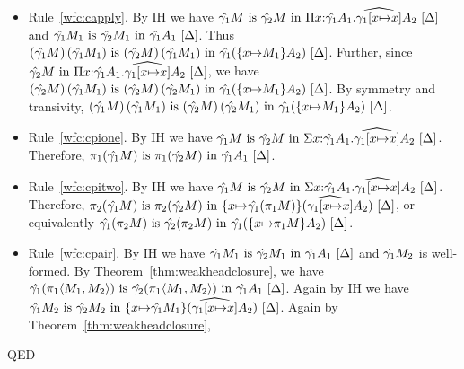 \documentclass{article}
\theoremstyle{break}
\newcommand{\qed}{\mbox{QED}}
\newcommand{\env}{\gamma}
\newcommand{\envone}{\hat{\env_1}}
\newcommand{\envtwo}{\hat{\env_2}}
\newcommand{\envonex}{\widehat{\env_1[\cvar{\mapsto}\cvar]}}
\newenvironment{proof}{\noindent{\bf Proof:}\hspace*{0.5em}}{\hspace*{\fill}\qed}
\begin{document}
\begin{proof}
\begin{itemize}
\item Rule~\ref{wfc:capply}.
By IH we have
$\semanticequivterm{\world}{\envone\constructor}{\envtwo\constructor}
  {\kpi{\cvar}{\envone{\kind_1}}{\envonex{\kind_2}}}$ and
$\semanticequivterm{\world}{\envone\constructor_1}{\envtwo\constructor_1}{\envone\kind_1}$.
Thus
$\semanticequivterm{\world}{\capply{(\envone\constructor)}{(\envone{\constructor_1})}}
   {\capply{(\envtwo\constructor)}{(\envone{\constructor_1})}}
   {\envone(\substitute{\cvar}{\constructor_1}{\kind_2})}$.
Further, since 
$\semanticvalidterm{\world}{\envtwo\constructor}{\kpi{\cvar}{\envone{\kind_1}}{\envonex{\kind_2}}}$,
we have
$\semanticequivterm{\world}{\capply{(\envtwo\constructor)}{(\envone{\constructor_1})}}
   {\capply{(\envtwo\constructor)}{(\envtwo{\constructor_1})}}
   {\envone(\substitute{\cvar}{\constructor_1}{\kind_2})}$.
By symmetry and transivity,
$\semanticequivterm{\world}{\capply{(\envone\constructor)}{(\envone{\constructor_1})}}
   {\capply{(\envtwo\constructor)}{(\envtwo{\constructor_1})}}
   {\envone(\substitute{\cvar}{\constructor_1}{\kind_2})}$.
\item Rule~\ref{wfc:cpione}.
By IH we have
$\semanticequivterm{\world}{\envone\constructor}{\envtwo\constructor}
    {\ksigma{\cvar}{\envone{\kind_1}}{\envonex{\kind_2}}}$.
Therefore, 
$\semanticequivterm{\world}{\cpi{1}{(\envone\constructor)}}{\cpi{1}{(\envtwo\constructor)}}{\envone\kind_1}$.
\item Rule~\ref{wfc:cpitwo}.
By IH we have
$\semanticequivterm{\world}{\envone\constructor}{\envtwo\constructor}
    {\ksigma{\cvar}{\envone{\kind_1}}{\envonex{\kind_2}}}$.
Therefore, 
$\semanticequivterm{\world}{\cpi{2}{(\envone\constructor)}}{\cpi{2}{(\envtwo\constructor)}}
   {\substitute{\cvar}{\envone(\cpi{1}{\constructor})}{(\envonex{\kind_2})}}$, or equivalently
$\semanticequivterm{\world}{\envone(\cpi{2}{\constructor})}{\envtwo(\cpi{2}{\constructor})}
   {\envone(\substitute{\cvar}{\cpi{1}{\constructor}}{\kind_2})}$.
\item Rule~\ref{wfc:cpair}.
By IH we have
$\semanticequivterm{\world}{\envone\constructor_1}{\envtwo\constructor_1}{\envone\kind_1}$
and $\envone\constructor_2$ is well-formed.
By Theorem~\ref{thm:weakheadclosure}, we have
$\semanticequivterm{\world}{\envone(\cpi{1}{\cpair{\constructor_1}{\constructor_2}})}
   {\envtwo(\cpi{1}{\cpair{\constructor_1}{\constructor_2}})}{\envone\kind_1}$.
Again by IH we have
$\semanticequivterm{\world}{\envone\constructor_2}{\envtwo\constructor_2}
   {\substitute{\cvar}{\envone\constructor_1}{(\envonex\kind_2)}}$.
Again by Theorem~\ref{thm:weakheadclosure},

\end{itemize}
\end{proof}
\end{document}
